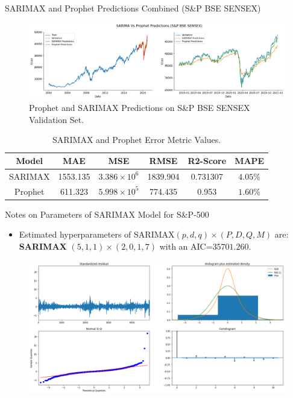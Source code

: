 \documentclass{beamer}
\begin{document}
\begin{frame}{SARIMAX and Prophet Predictions Combined (S\&P BSE SENSEX)}
	\begin{figure}
		\centering
		\includegraphics[width = \textwidth]{images/SARIMAX-Prophet-SENSEX-Predictions.png}
		\caption{Prophet and SARIMAX Predictions on S\&P BSE SENSEX Validation Set.}
		\label{fig:my_label}
		\pause
	\end{figure}
	\begin{table}[]
		\centering
		\begin{tabular}{c c c c c c}
			\textbf{Model} & \textbf{MAE} & \textbf{MSE}          & \textbf{RMSE} & \textbf{R2-Score} & \textbf{MAPE} \\
			\toprule
			SARIMAX        & 1553.135     & $3.386 \times 10^{6}$ & 1839.904      & 0.731307          & $4.05 \%$     \\
			Prophet        & 611.323      & $5.998 \times 10^{5}$ & 774.435       & 0.953             & $1.60\%$      
			\bottomrule
		\end{tabular}
		\caption{SARIMAX and Prophet Error Metric Values.}
		\label{tab:my_label}
	\end{table}
\end{frame}

\begin{frame}{Notes on Parameters of SARIMAX Model for S\&P-500}
	\begin{itemize}
		\item Estimated hyperparameters of SARIMAX$(p, d, q) \times (P, D, Q, M)$ are: \textbf{SARIMAX} $(5, 1, 1) \times (2, 0, 1, 7)$ with an AIC=$35701.260$.
	\end{itemize}
	\begin{figure}
		\centering
		\includegraphics[width = \textwidth]{images/S&P-500 Auto ARIMA Training Results.png}
	\end{figure}
\end{frame}
\end{document}
